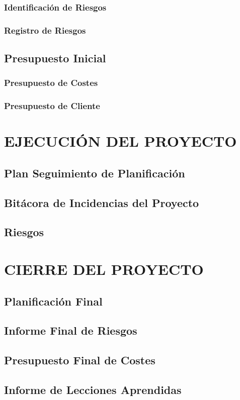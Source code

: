 \subsubsection{Identificación de Riesgos}

\subsubsection{Registro de Riesgos} 



\subsection{Presupuesto Inicial}

\subsubsection{Presupuesto de Costes}

\subsubsection{Presupuesto de Cliente} 


\newpage
\section{EJECUCIÓN DEL PROYECTO}

\subsection{Plan Seguimiento de Planificación}

\subsection{Bitácora de Incidencias del Proyecto}

\subsection{Riesgos}


\newpage
\section{CIERRE DEL PROYECTO}

\subsection{Planificación Final}

\subsection{Informe Final de Riesgos}

\subsection{Presupuesto Final de Costes}

\subsection{Informe de Lecciones Aprendidas}
